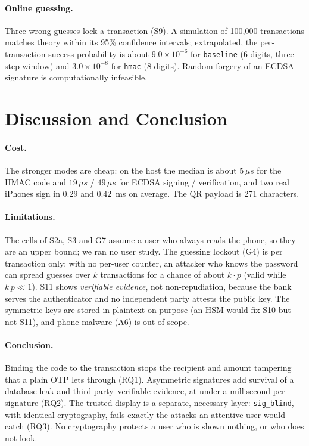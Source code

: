 \paragraph{Online guessing.}
Three wrong guesses lock a transaction (S9). A simulation of 100{,}000
transactions matches theory within its 95\% confidence intervals; extrapolated,
the per-transaction success probability is about $9.0\times10^{-6}$ for
\texttt{baseline} (6 digits, three-step window) and $3.0\times10^{-8}$ for
\texttt{hmac} (8 digits). Random forgery of an ECDSA signature is
computationally infeasible.

\section{Discussion and Conclusion}\label{sec:main-conclusion}
\paragraph{Cost.}
The stronger modes are cheap: on the host the median is about $5\,\mu s$ for the
HMAC code and $19\,\mu s$ / $49\,\mu s$ for ECDSA signing / verification, and two
real iPhones sign in $0.29$ and $0.42$~ms on average. The QR payload is 271
characters.

\paragraph{Limitations.}
The \cmark{} cells of S2a, S3 and G7 assume a user who always reads the phone, so
they are an upper bound; we ran no user study. The guessing lockout (G4) is per
transaction only: with no per-user counter, an attacker who knows the password
can spread guesses over $k$ transactions for a chance of about $k\cdot p$
(valid while $k\,p \ll 1$). S11
shows \emph{verifiable evidence}, not non-repudiation, because the bank serves
the authenticator and no independent party attests the public key. The symmetric
keys are stored in plaintext on purpose (an HSM would fix S10 but not S11), and
phone malware (A6) is out of scope.

\paragraph{Conclusion.}
Binding the code to the transaction stops the recipient and amount tampering
that a plain OTP lets through (RQ1). Asymmetric signatures add survival of a
database leak and third-party--verifiable evidence, at under a millisecond per
signature (RQ2). The trusted display is a separate, necessary layer:
\texttt{sig\_blind}, with identical cryptography, fails exactly the attacks an
attentive user would catch (RQ3). No cryptography protects a user who is shown
nothing, or who does not look.
